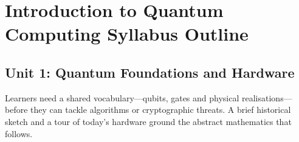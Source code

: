 \section{Introduction to Quantum Computing Syllabus Outline}







\subsection{Unit 1: Quantum Foundations and Hardware}



Learners need a shared vocabulary—qubits, gates and physical realisations—before they can tackle algorithms or cryptographic threats. 
A brief historical sketch and a tour of today’s hardware ground the abstract mathematics that follows.

